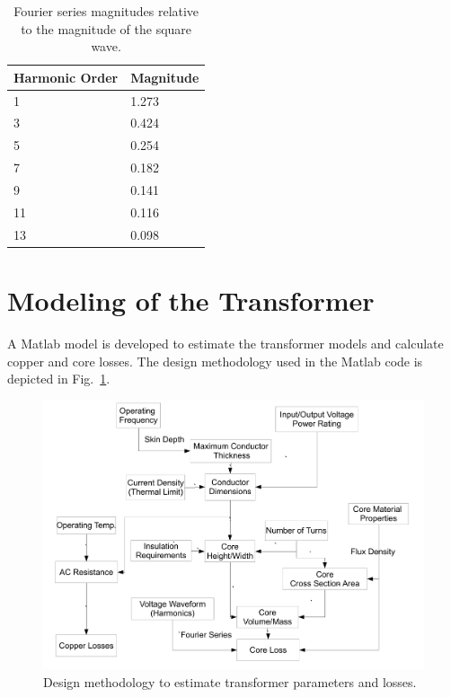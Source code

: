 \documentclass[a4paper, 11pt]{article} %
\begin{document}
\begin{table}[]
\begin{center}
\begin{tabular}{ll}
Harmonic Order & Magnitude\\
\hline
1 & 1.273\\
3 & 0.424 \\
5 & 0.254 \\
7 & 0.182 \\
9 & 0.141 \\
11 & 0.116 \\
13 & 0.098 \\
\hline
\end{tabular} 
\end{center}
\caption{Fourier series magnitudes relative to the magnitude of the square wave.}
\label{square_harmonics}
\end{table}


\section{Modeling of the Transformer}

A Matlab model is developed to estimate the transformer models and calculate copper and core losses. The design methodology used in the Matlab code is depicted in Fig.~\ref{design_method}.

\begin{figure}[]
  \centering
    \includegraphics[scale=0.4]{design_method}
  \caption{Design methodology to estimate transformer parameters and losses.}
  \label{design_method}
\end{figure}
\end{document}
